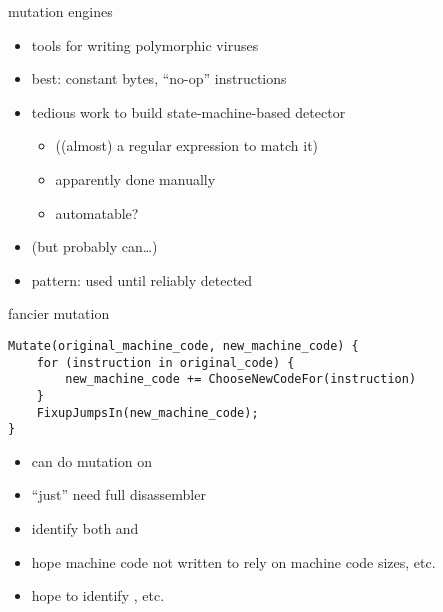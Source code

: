 \usetikzlibrary{arrows.meta}
\begin{frame}{mutation engines}
    \begin{itemize}
    \item tools for writing polymorphic viruses
    \item best:  constant bytes,  ``no-op'' instructions
    \item tedious work to build state-machine-based detector
        \begin{itemize}
        \item ((almost) a regular expression to match it)
        \item apparently done manually
        \item automatable?
        \end{itemize}
    \item (but probably can\ldots)
    \item pattern: used until reliably detected
    \end{itemize}
\end{frame}

\begin{frame}[fragile,label=fancyMut]{fancier mutation}
\begin{lstlisting}[style=script]
Mutate(original_machine_code, new_machine_code) {
    for (instruction in original_code) {
        new_machine_code += ChooseNewCodeFor(instruction)
    }
    FixupJumpsIn(new_machine_code);
}
\end{lstlisting}
    \begin{itemize}
    \item can do mutation on 
    \vspace{.5cm}
    \item ``just'' need full disassembler
    \item identify both  and 
    \item hope machine code not written to rely on machine code sizes, etc.
    \item hope to identify , etc.
    \end{itemize}
\end{frame}

